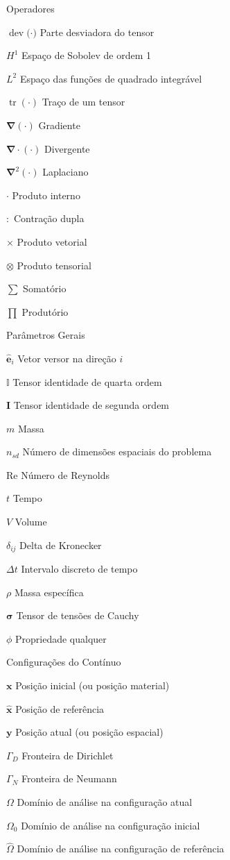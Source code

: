 \documentclass[12pt,
	openright,	%
	twoside,    %
	a4paper,			%
	sumario=tradicional,
	english,			%
	french, 			%
	brazil				%
]{USPSC}
\newcommand{\tr}{\mathop{\mathrm{tr}}\nolimits}
\newcommand{\dev}[1]{\mathop{\mathrm{dev}}\nolimits{#1}}
\newcommand{\Rey}{\mathrm{Re}}
\begin{document}
\begin{simbolos}
    \item[Operadores]
    \item[$\dev(\cdot)$] Parte desviadora do tensor
    \item[$H^1$] Espaço de Sobolev de ordem 1
    \item[$L^2$] Espaço das funções de quadrado integrável
    \item[$\tr(\cdot)$] Traço de um tensor
    \item[$\mathbf{\nabla}(\cdot)$] Gradiente
    \item[$\mathbf{\nabla}\cdot(\cdot)$] Divergente
    \item[$\mathbf{\nabla}^2(\cdot)$] Laplaciano
    \item[$\cdot$] Produto interno
    \item[$:$] Contração dupla
    \item[$\times$] Produto vetorial
    \item[$\otimes$] Produto tensorial
    \item[$\sum$] Somatório
    \item[$\prod$] Produtório
    
    \item[Parâmetros Gerais]
    \item[$\hat{\mathbf{e}}_i$] Vetor versor na direção $i$
    \item[$\mathbb{I}$] Tensor identidade de quarta ordem
    \item[$\mathbf{I}$] Tensor identidade de segunda ordem
    \item[$m$] Massa
    \item[$n_{sd}$] Número de dimensões espaciais do problema
    \item[$\Rey$] Número de Reynolds
    \item[$t$] Tempo
    \item[$V$] Volume
    \item[$\delta_{ij}$] Delta de Kronecker
    \item[$\Delta t$] Intervalo discreto de tempo
    \item[$\rho$] Massa específica
    \item[$\mathbf{\sigma}$] Tensor de tensões de Cauchy
    \item[$\phi$] Propriedade qualquer
    
    \item[Configurações do Contínuo]
    \item[$\mathbf{x}$] Posição inicial (ou posição material)
    \item[$\mathbf{\hat{x}}$] Posição de referência
    \item[$\mathbf{y}$] Posição atual (ou posição espacial)
    \item[$\Gamma_D$] Fronteira de Dirichlet
    \item[$\Gamma_N$] Fronteira de Neumann
    \item[$\Omega$] Domínio de análise na configuração atual
    \item[$\Omega_0$] Domínio de análise na configuração inicial
    \item[$\hat{\Omega}$] Domínio de análise na configuração de referência
    

\end{simbolos}
\end{document}

